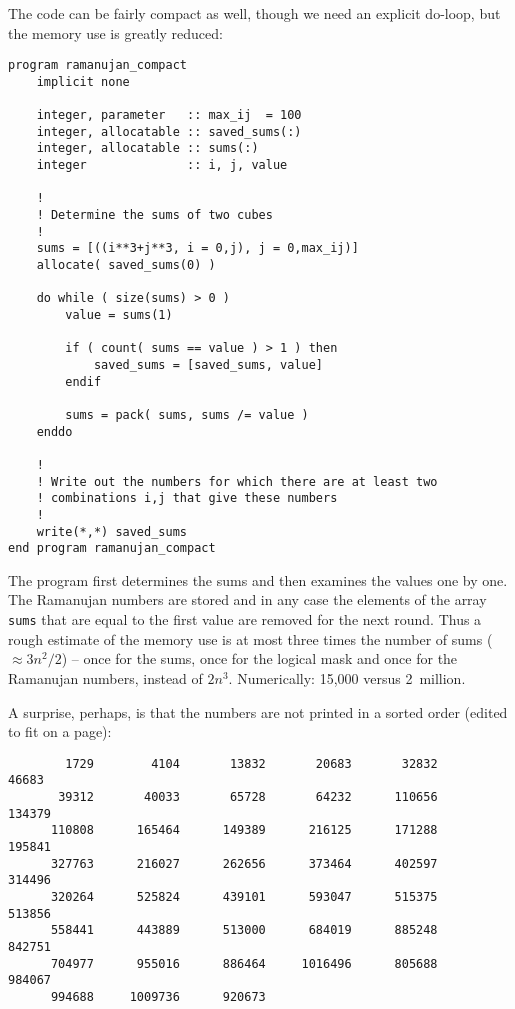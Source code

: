 \documentclass[onecolumn]{article}
\begin{document}
The code can be fairly compact as well, though we need an explicit do-loop, but the memory use is greatly reduced:

\begin{verbatim}
program ramanujan_compact
    implicit none

    integer, parameter   :: max_ij  = 100
    integer, allocatable :: saved_sums(:)
    integer, allocatable :: sums(:)
    integer              :: i, j, value

    !
    ! Determine the sums of two cubes
    !
    sums = [((i**3+j**3, i = 0,j), j = 0,max_ij)]
    allocate( saved_sums(0) )

    do while ( size(sums) > 0 )
        value = sums(1)

        if ( count( sums == value ) > 1 ) then
            saved_sums = [saved_sums, value]
        endif

        sums = pack( sums, sums /= value )
    enddo

    !
    ! Write out the numbers for which there are at least two
    ! combinations i,j that give these numbers
    !
    write(*,*) saved_sums
end program ramanujan_compact
\end{verbatim}

The program first determines the sums and then examines the values one by one. The Ramanujan numbers are stored and in any case the
elements of the array \verb+sums+ that are equal to the first value are removed for the next round. Thus a rough estimate of the memory use
is at most three times the number of sums ($\approx 3 n^2/2$) -- once for the sums, once for the logical mask and once for the Ramanujan numbers,
instead of $2 n^3$. Numerically: 15,000 versus 2~million.

A surprise, perhaps, is that the numbers are not printed in a sorted order (edited to fit on a page):
\begin{verbatim}
        1729        4104       13832       20683       32832       46683
       39312       40033       65728       64232      110656      134379
      110808      165464      149389      216125      171288      195841
      327763      216027      262656      373464      402597      314496
      320264      525824      439101      593047      515375      513856
      558441      443889      513000      684019      885248      842751
      704977      955016      886464     1016496      805688      984067
      994688     1009736      920673
\end{verbatim}
\end{document}
